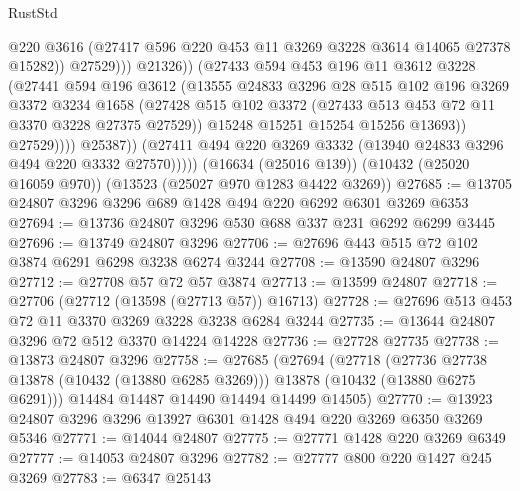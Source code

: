 \begin{lexlean}{RustStd}
\begin{coremodule}
                                @220
                                @3616
                                (@27417 @596 @220 @453 @11 @3269 @3228 @3614 @14065 @27378 @15282))
                              @27529)))
                        @21326))
                    (@27433
                      @594
                      @453
                      @196
                      @11
                      @3612
                      @3228
                      (@27441
                        @594
                        @196
                        @3612
                        (@13555
                          @24833
                          @3296
                          @28
                          @515
                          @102
                          @196
                          @3269
                          @3372
                          @3234
                          @1658
                          (@27428
                            @515
                            @102
                            @3372
                            (@27433 @513 @453 @72 @11 @3370 @3228 @27375 @27529))
                          @15248
                          @15251
                          @15254
                          @15256
                          @13693))
                      @27529))))
              @25387))
          (@27411 @494 @220 @3269 @3332 (@13940 @24833 @3296 @494 @220 @3332 @27570)))))
    (@16634 (@25016 @139))
    (@10432 (@25020 @16059 @970))
    (@13523 (@25027 @970 @1283 @4422 @3269))
@27685 := @13705 @24807 @3296 @3296 @689 @1428 @494 @220 @6292 @6301 @3269 @6353
@27694 := @13736 @24807 @3296 @530 @688 @337 @231 @6292 @6299 @3445
@27696 := @13749 @24807 @3296
@27706 := @27696 @443 @515 @72 @102 @3874 @6291 @6298 @3238 @6274 @3244
@27708 := @13590 @24807 @3296
@27712 := @27708 @57 @72 @57 @3874
@27713 := @13599 @24807
@27718 := @27706 (@27712 (@13598 (@27713 @57)) @16713)
@27728 := @27696 @513 @453 @72 @11 @3370 @3269 @3228 @3238 @6284 @3244
@27735 := @13644 @24807 @3296 @72 @512 @3370 @14224 @14228
@27736 := @27728 @27735
@27738 := @13873 @24807 @3296
@27758 := @27685
    (@27694
      (@27718
        (@27736 @27738 @13878 (@10432 (@13880 @6285 @3269)))
        @13878
        (@10432 (@13880 @6275 @6291)))
      @14484
      @14487
      @14490
      @14494
      @14499
      @14505)
@27770 := @13923 @24807 @3296 @3296 @13927 @6301 @1428 @494 @220 @3269 @6350 @3269 @5346
@27771 := @14044 @24807
@27775 := @27771 @1428 @220 @3269 @6349
@27777 := @14053 @24807 @3296
@27782 := @27777 @800 @220 @1427 @245 @3269
@27783 := @6347 @25143

\end{coremodule}
\end{lexlean}
